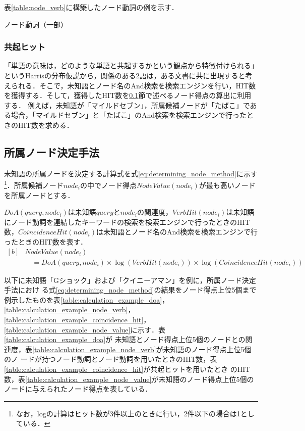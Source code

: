 \documentclass[japanese]{jnlp_1.4}
\begin{document}
表\ref{table:node_verb}に構築したノード動詞の例を示す．

\begin{table}[b]
\caption{ノード動詞（一部）}

\label{table:node_verb}
\end{table}


\subsubsection{共起ヒット}\label{coincidence_hit}

「単語の意味は，どのような単語と共起するかという観点から特徴付けられる」というHarrisの分布仮説から\cite{harris:68}，関係のある2語は，ある文書に共に出現すると考えられる．そこで，未知語とノード名のAnd検索を検索エンジンを行い，HIT数を獲得する．そして，獲得したHIT数を\ref{determining_node_method}節で述べるノード得点の算出に利用する．
例えば，未知語が「マイルドセブン」，所属候補ノードが「たばこ」である場合，「マイルドセブン」と「たばこ」のAnd検索を検索エンジンで行ったときのHIT数を求める．


\subsection{所属ノード決定手法}\label{determining_node_method}

未知語の所属ノードを決定する計算式を式\ref{eq:determining_node_method}に示す\footnote{なお，logの計算はヒット数が3件以上のときに行い，2件以下の場合は1としている．}．所属候補ノード$\mathit{node}_i$の中でノード得点$\mathit{NodeValue}(\mathit{node}_i)$が最も高いノードを所属ノードとする．

$\mathit{DoA}(\mathit{query}, \mathit{node}_i)$は未知語$\mathit{query}$と$\mathit{node}_i$の関連度，$\mathit{VerbHit}(\mathit{node}_i)$は未知語にノード動詞を連結したキーワードの検索を検索エンジンで行ったときのHIT数，$\mathit{CoincidenceHit}(\mathit{node}_i)$は未知語とノード名のAnd検索を検索エンジンで行ったときのHIT数を表す．
\begin{equation}
\begin{aligned}[b]
 & NodeValue(node_i) \\
 & \quad = DoA(\mathit{query}, \mathit{node}_i) \times \log(\mathit{VerbHit}(\mathit{node}_i))
	\times\log(\mathit{CoincidenceHit}(\mathit{node}_i))
	\label{eq:determining_node_method}
\end{aligned}
\end{equation}

以下に未知語「Gショック」および「クイニーアマン」を例に，所属ノード決定手法におけ
る式\ref{eq:determining_node_method}の結果をノード得点上位5個まで例示したものを表\ref{table:calculation_example_doa}，
\ref{table:calculation_example_node_verb}，\ref{table:calculation_example_coincidence_hit}，
\ref{table:calculation_example_node_value}に示す．表\ref{table:calculation_example_doa}が
未知語とノード得点上位5個のノードとの関連度，表\ref{table:calculation_example_node_verb}が未知語のノード得点上位5個のノ
ードが持つノード動詞とノード動詞を用いたときのHIT数，表\ref{table:calculation_example_coincidence_hit}が共起ヒットを用いたとき
のHIT数，表\ref{table:calculation_example_node_value}が未知語のノード得点上位5個のノードに与えられたノード得点を表している．
\end{document}
